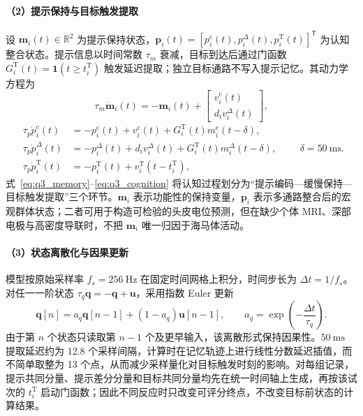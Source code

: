 \documentclass[a4paper]{ctexart}
\numberwithin{figure}{section}       %
\begin{document}
\paragraph{（2）提示保持与目标触发提取}

设 $\boldsymbol m_i(t)\in\mathbb R^2$ 为提示保持状态，$\boldsymbol p_i(t)=[p_i^{\mathrm c}(t),p_i^{\Delta}(t),p_i^{\mathrm T}(t)]^{\mathsf T}$ 为认知整合状态。提示信息以时间常数 $\tau_m$ 衰减，目标到达后通过门函数 $G_i^{\mathrm T}(t)=\mathbf 1(t\ge t_i^{\mathrm T})$ 触发延迟提取；独立目标通路不写入提示记忆。其动力学方程为
\begin{equation}
\tau_m\dot{\boldsymbol m}_i(t)
=-\boldsymbol m_i(t)+
\begin{bmatrix}v_i^{\mathrm c}(t)\\ d_i v_i^{\Delta}(t)\end{bmatrix},
\tag{3-4}
\label{eq:q3_memory}
\end{equation}
\begin{equation}
\begin{aligned}
\tau_p\dot{p}_i^{\mathrm c}(t)
&=-p_i^{\mathrm c}(t)+v_i^{\mathrm c}(t)+G_i^{\mathrm T}(t)m_i^{\mathrm c}(t-\delta),\\
\tau_p\dot{p}_i^{\Delta}(t)
&=-p_i^{\Delta}(t)+d_i v_i^{\Delta}(t)+G_i^{\mathrm T}(t)m_i^{\Delta}(t-\delta),\\
\tau_p\dot{p}_i^{\mathrm T}(t)
&=-p_i^{\mathrm T}(t)+v_i^{\mathrm T}(t-t_i^{\mathrm T}),
\end{aligned}
\qquad \delta=50~\mathrm{ms}.
\tag{3-5}
\label{eq:q3_cognition}
\end{equation}
式~\eqref{eq:q3_memory}--\eqref{eq:q3_cognition} 将认知过程划分为“提示编码---缓慢保持---目标触发提取”三个环节。$\boldsymbol m_i$ 表示功能性的保持变量，$\boldsymbol p_i$ 表示多通路整合后的宏观群体状态；二者可用于构造可检验的头皮电位预测，但在缺少个体 MRI、深部电极与高密度导联时，不把 $\boldsymbol m_i$ 唯一归因于海马体活动。

\paragraph{（3）状态离散化与因果更新}

模型按原始采样率 $f_s=256~\mathrm{Hz}$ 在固定时间网格上积分，时间步长为 $\Delta t=1/f_s$。对任一一阶状态 $\tau_q\dot{\boldsymbol q}=-\boldsymbol q+\boldsymbol u$，采用指数 Euler 更新
\[
\boldsymbol q[n]=a_q\boldsymbol q[n-1]+(1-a_q)\boldsymbol u[n-1],
\qquad a_q=\exp\!\left(-\frac{\Delta t}{\tau_q}\right).
\]
由于第 $n$ 个状态只读取第 $n-1$ 个及更早输入，该离散形式保持因果性。$50~\mathrm{ms}$ 提取延迟约为 12.8 个采样间隔，计算时在记忆轨迹上进行线性分数延迟插值，而不简单取整为 13 个点，从而减少采样量化对目标触发时刻的影响。对每组记录，提示共同分量、提示差分分量和目标共同分量均先在统一时间轴上生成，再按该试次的 $t_i^{\mathrm T}$ 启动门函数；因此不同反应时只改变可评分终点，不改变目标前状态的计算结果。
\end{document}
